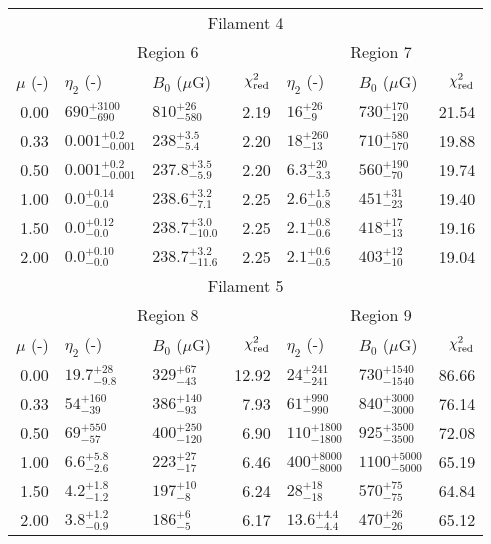 \begin{tabular}{@{}rllr llr@{}}
\midrule
\multicolumn{7}{c}{Filament 4} \\
\cmidrule{1-7}
{} & \multicolumn{3}{c}{Region 6\tablenotemark{a,b}}
   & \multicolumn{3}{c}{Region 7} \\
\cmidrule(lr){2-4} \cmidrule(l){5-7}
$\mu$ (-) & $\eta_2$ (-) & $B_0$ ($\mu$G) & $\chi^2_{\mathrm{red}}$
          & $\eta_2$ (-) & $B_0$ ($\mu$G) & $\chi^2_{\mathrm{red}}$ \\
\cmidrule{1-7}

0.00 & ${690}^{+3100}_{-690}$ & ${810}^{+26}_{-580}$       & 2.19
     & ${16}^{+26}_{-9}$ & ${730}^{+170}_{-120}$           & 21.54 \\
0.33 & ${0.001}^{+0.2}_{-0.001}$ & ${238}^{+3.5}_{-5.4}$   & 2.20
     & ${18}^{+260}_{-13}$ & ${710}^{+580}_{-170}$         & 19.88 \\
0.50 & ${0.001}^{+0.2}_{-0.001}$ & ${237.8}^{+3.5}_{-5.9}$ & 2.20
     & ${6.3}^{+20}_{-3.3}$ & ${560}^{+190}_{-70}$         & 19.74 \\
1.00 & ${0.0}^{+0.14}_{-0.0}$ & ${238.6}^{+3.2}_{-7.1}$        & 2.25
     & ${2.6}^{+1.5}_{-0.8}$ & ${451}^{+31}_{-23}$         & 19.40 \\
1.50 & ${0.0}^{+0.12}_{-0.0}$ & ${238.7}^{+3.0}_{-10.0}$       & 2.25
     & ${2.1}^{+0.8}_{-0.6}$ & ${418}^{+17}_{-13}$         & 19.16 \\
2.00 & ${0.0}^{+0.10}_{-0.0}$ & ${238.7}^{+3.2}_{-11.6}$       & 2.25
     & ${2.1}^{+0.6}_{-0.5}$ & ${403}^{+12}_{-10}$         & 19.04 \\

\midrule
\multicolumn{7}{c}{Filament 5} \\
\cmidrule{1-7}
{} & \multicolumn{3}{c}{Region 8\tablenotemark{a}}
   & \multicolumn{3}{c}{Region 9\tablenotemark{c}} \\
\cmidrule(lr){2-4} \cmidrule(l){5-7}
$\mu$ (-) & $\eta_2$ (-) & $B_0$ ($\mu$G) & $\chi^2_{\mathrm{red}}$
          & $\eta_2$ (-) & $B_0$ ($\mu$G) & $\chi^2_{\mathrm{red}}$ \\
\cmidrule{1-7}

0.00 & ${19.7}^{+28}_{-9.8}$ & ${329}^{+67}_{-43}$     & 12.92
     & ${24}^{+241}_{-241}$ & ${730}^{+1540}_{-1540}$  & 86.66 \\
0.33 & ${54}^{+160}_{-39}$ & ${386}^{+140}_{-93}$      & 7.93
     & ${61}^{+990}_{-990}$ & ${840}^{+3000}_{-3000}$       & 76.14 \\
0.50 & ${69}^{+550}_{-57}$ & ${400}^{+250}_{-120}$          & 6.90
     & ${110}^{+1800}_{-1800}$ & ${925}^{+3500}_{-3500}$    & 72.08 \\
1.00 & ${6.6}^{+5.8}_{-2.6}$ & ${223}^{+27}_{-17}$          & 6.46
     & ${400}^{+8000}_{-8000}$ & ${1100}^{+5000}_{-5000}$   & 65.19 \\
1.50 & ${4.2}^{+1.8}_{-1.2}$ & ${197}^{+10}_{-8}$           & 6.24
     & ${28}^{+18}_{-18}$ & ${570}^{+75}_{-75}$             & 64.84 \\
2.00 & ${3.8}^{+1.2}_{-0.9}$ & ${186}^{+6}_{-5}$            & 6.17
     & ${13.6}^{+4.4}_{-4.4}$ & ${470}^{+26}_{-26}$           & 65.12 \\

\bottomrule
\end{tabular}
